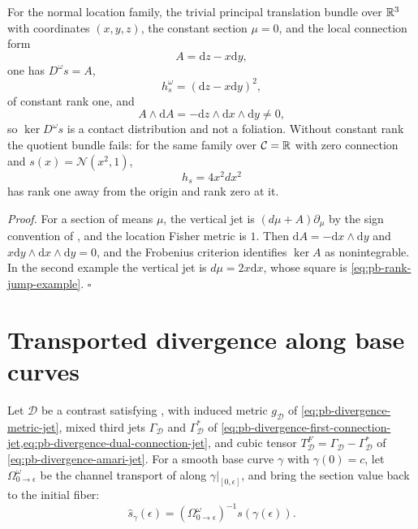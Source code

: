 For the normal location family, the trivial principal translation bundle over \(\mathbb R^3\) with
coordinates \((x,y,z)\), the constant section \(\mu=0\), and the local connection form
\begin{equation}
A=\mathrm dz-x\mathrm dy,
\label{eq:pb-contact-connection}
\end{equation}
one has \(D^\omega s=A\),
\begin{equation}
h_s^\omega=(\mathrm dz-x\mathrm dy)^2,
\label{eq:pb-contact-pullback}
\end{equation}
of constant rank one, and
\begin{equation}
A\wedge\mathrm dA
=-\mathrm dz\wedge\mathrm dx\wedge\mathrm dy\ne0,
\label{eq:pb-contact-frobenius}
\end{equation}
so \(\ker D^\omega s\) is a contact distribution and not a foliation. Without constant rank the
quotient bundle fails: for the same family over \(\mathcal C=\mathbb R\) with zero connection and
\(s(x)=\mathcal N(x^2,1)\),
\begin{equation}
h_s=4x^2dx^2
\label{eq:pb-rank-jump-example}
\end{equation}
has rank one away from the origin and rank zero at it. 

\noindent\emph{Proof.}
For a section of means \(\mu\), the vertical jet is \((d\mu+A)\partial_\mu\) by the sign convention of
, and the location Fisher metric is \(1\). Then
\(\mathrm dA=-\mathrm dx\wedge\mathrm dy\) and \(x\mathrm dy\wedge\mathrm dx\wedge\mathrm dy=0\), and
the Frobenius criterion identifies \(\ker A\) as nonintegrable. In the second example the vertical jet
is \(d\mu=2x\mathrm dx\), whose square is \eqref{eq:pb-rank-jump-example}. \hfill$\square$

\section{Transported divergence along base curves}
\label{sec:pb-transported-divergence}

Let \(\mathscr D\) be a contrast satisfying , with induced metric
\(g_{\mathscr D}\) of \eqref{eq:pb-divergence-metric-jet}, mixed third jets \(\Gamma_{\mathscr D}\)
and \(\Gamma^*_{\mathscr D}\) of \cref{eq:pb-divergence-first-connection-jet,eq:pb-divergence-dual-connection-jet},
and cubic tensor \(T^F_{\mathscr D}=\Gamma_{\mathscr D}-\Gamma^*_{\mathscr D}\) of
\eqref{eq:pb-divergence-amari-jet}. For a smooth base curve \(\gamma\) with \(\gamma(0)=c\), let
\(\Omega^\omega_{0\to\epsilon}\) be the channel transport of  along
\(\gamma|_{[0,\epsilon]}\), and bring the section value back to the initial fiber:
\begin{equation}
\widehat s_\gamma(\epsilon)
=(\Omega^\omega_{0\to\epsilon})^{-1}s(\gamma(\epsilon)).
\label{eq:pb-transported-section-curve}
\end{equation}

